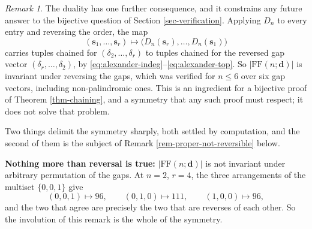 \documentclass[11pt, a4paper, abstract=yes]{scrartcl}
\theoremstyle{definition}
\theoremstyle{remark}
\newtheorem{remark}[definition]{Remark}
\theoremstyle{plain}
\newcommand{\vek}[1]{\boldsymbol{#1}}
\begin{document}
\begin{remark}
The duality has one further consequence, and it constrains any future answer to the bijective
question of Section \ref{sec-verification}. Applying \(D_n\) to every entry and reversing the order, the map
\begin{equation}\label{eq:gap-reversal-map}
  (\vek s_1,\dots,\vek s_r)\longmapsto\bigl(D_n(\vek s_r),\dots,D_n(\vek s_1)\bigr)
\end{equation}
carries tuples chained for \((\delta_2,\dots,\delta_r)\) to tuples chained for the reversed gap
vector \((\delta_r,\dots,\delta_2)\), by \eqref{eq:alexander-indeg}--\eqref{eq:alexander-top}. So
\(|\mathrm{FF}(n;\vek d)|\) is
invariant under reversing the gaps, which was verified for \(n\le6\) over six gap vectors,
including non-palindromic ones. This is an ingredient for a bijective proof of
Theorem \ref{thm-chaining}, and a symmetry that any such proof must respect; it does not solve that
problem.

Two things delimit the symmetry sharply, both settled by computation, and the second of them is the
subject of Remark \ref{rem-proper-not-reversible} below.

\textbf{Nothing more than reversal is true:} \(\lvert\mathrm{FF}(n;\vek d)\rvert\) is not invariant under arbitrary
permutation of the gaps. At \(n=2\), \(r=4\), the three arrangements of the multiset
\(\lbrace0,0,1\rbrace\) give
\begin{equation}\label{eq:no-permutation-invariance}
  (0,0,1)\mapsto96,\qquad (0,1,0)\mapsto111,\qquad (1,0,0)\mapsto96 ,
\end{equation}
and the two that agree are precisely the two that are reverses of each other. So the involution of
this remark is the whole of the symmetry.
\label{rem-gap-reversal}
\end{remark}
\end{document}
